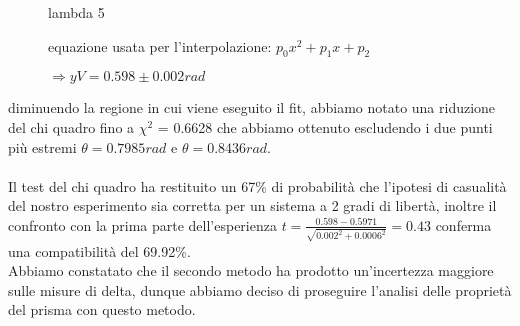 \documentclass[a4paper]{article}
\theoremstyle{definition}
\begin{document}
\begin{figure}[!htbp]
    	\captionsetup{labelformat=empty}
        \caption{lambda 5}
    \end{figure}
\pagebreak
\begin{figure}[!ht]
    	\captionsetup{labelformat=empty}

	\caption{equazione usata per l'interpolazione: $p_{0}x^{2} + p_{1}x + p_{2}$}
		\caption{ $ \Rightarrow yV =  0.598\pm0.002rad$}
\end{figure}
\noindent diminuendo la regione in cui viene eseguito il fit, abbiamo notato una riduzione del chi quadro fino a $\chi^{2}$ = 0.6628 che abbiamo ottenuto escludendo i due punti più estremi $\theta= 0.7985rad$ e $\theta = 0.8436rad$.\\\\
Il test del chi quadro ha restituito un 67\% di probabilità che l'ipotesi di casualità del nostro esperimento sia corretta per un sistema a 2 gradi di libertà, inoltre il confronto con la prima parte dell'esperienza \( t = \frac{0.598- 0.5971}{\sqrt{  0.002^{2}+0.0006^{2}  }} = 0.43\) conferma una compatibilità del 69.92\%.\\

Abbiamo constatato che il secondo metodo ha prodotto un'incertezza maggiore sulle misure di delta,%
dunque abbiamo deciso di proseguire l'analisi delle proprietà del prisma con questo metodo.
\end{document}
